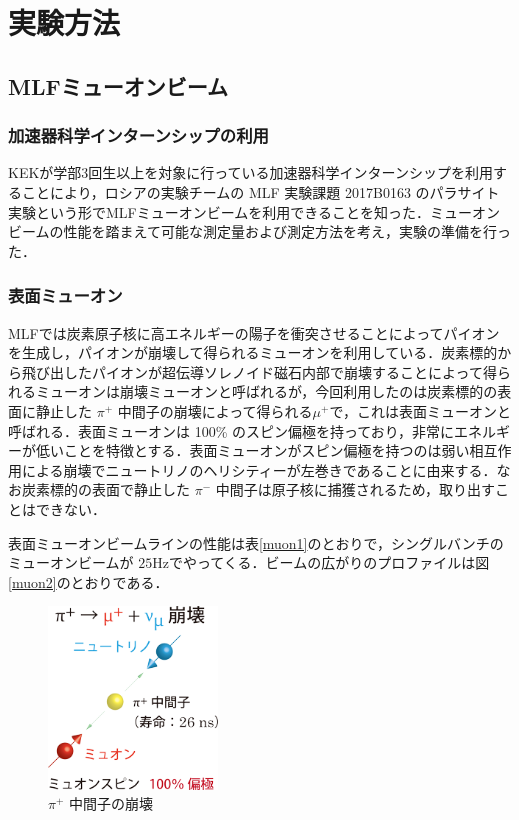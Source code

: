 



%

\section{実験方法}
\subsection{MLFミューオンビーム}
\subsubsection{加速器科学インターンシップの利用}
KEKが学部3回生以上を対象に行っている加速器科学インターンシップを利用することにより，ロシアの実験チームの MLF 実験課題 2017B0163 のパラサイト実験という形でMLFミューオンビームを利用できることを知った．ミューオンビームの性能を踏まえて可能な測定量および測定方法を考え，実験の準備を行った．
 \subsubsection{表面ミューオン}
 MLFでは炭素原子核に高エネルギーの陽子を衝突させることによってパイオンを生成し，パイオンが崩壊して得られるミューオンを利用している．炭素標的から飛び出したパイオンが超伝導ソレノイド磁石内部で崩壊することによって得られるミューオンは崩壊ミューオンと呼ばれるが，今回利用したのは炭素標的の表面に静止した $\pi^+$ 中間子の崩壊によって得られる$\mu ^+$で，これは表面ミューオンと呼ばれる．表面ミューオンは 100\% のスピン偏極を持っており，非常にエネルギーが低いことを特徴とする．表面ミューオンがスピン偏極を持つのは弱い相互作用による崩壊でニュートリノのヘリシティーが左巻きであることに由来する．なお炭素標的の表面で静止した $\pi^-$ 中間子は原子核に捕獲されるため，取り出すことはできない．\par
 表面ミューオンビームラインの性能は表\ref{muon1}のとおりで，シングルバンチのミューオンビームが $25 \mathrm{Hz}$でやってくる．ビームの広がりのプロファイルは図\ref{muon2}のとおりである．


\begin{figure}[H]
  \centering
  \includegraphics[width=0.4\textwidth]{figure/hayakawa/decay_pion.png}
  \caption{$\pi^+$ 中間子の崩壊}
\end{figure}

